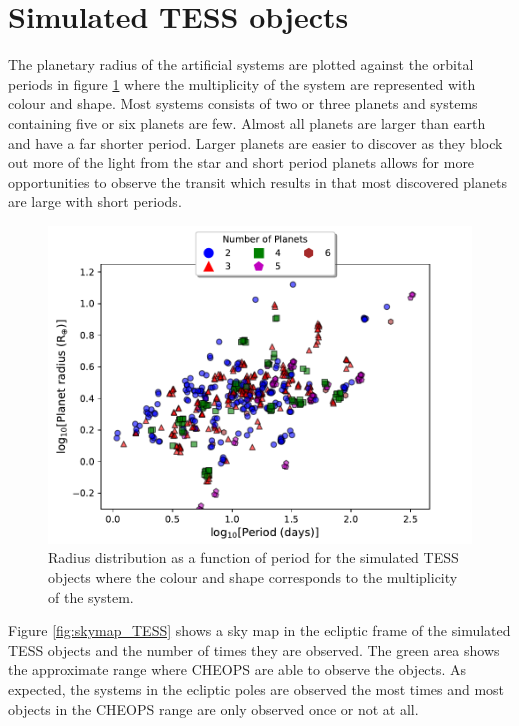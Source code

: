 \documentclass[12pt]{report}
\begin{document}
\section{Simulated TESS objects}
	The planetary radius of the artificial systems are plotted against the orbital periods in figure \ref{fig:RP_plot_temp_multi} where the multiplicity of the system are represented with colour and shape. Most systems consists of two or three planets and systems containing five or six planets are few. Almost all planets are larger than earth and have a far shorter period. Larger planets are easier to discover as they block out more of the light from the star and short period planets allows for more opportunities to observe the transit which results in that most discovered planets are large with short periods.

\begin{figure}[h!]
 	 \centering
 	 \includegraphics[width=\textwidth]{img/R_P-plot_numP1.pdf}
 	  	 \caption{Radius distribution as a function of period for the simulated TESS objects where the colour and shape corresponds to the multiplicity of the system.}
 	  	 \label{fig:RP_plot_temp_multi}
\end{figure}
	\newpage Figure \ref{fig:skymap_TESS} shows a sky map in the ecliptic frame of the simulated TESS objects and the number of times they are observed. The green area shows the approximate range where CHEOPS are able to observe the objects.  As expected, the systems in the ecliptic poles are observed the most times and most objects in the CHEOPS range are only observed once or not at all.
\end{document}
